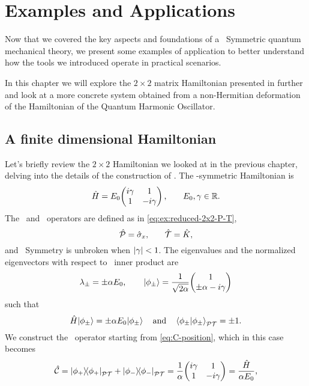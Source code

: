 \chapter{Examples and Applications}\label{ch:examples}
    Now that we covered the key aspects and foundations of a \PT\ Symmetric quantum mechanical theory, we present some examples of application to better understand how the tools we introduced operate in practical scenarios.
    
    In this chapter we will explore the $2\times2$ matrix Hamiltonian presented in  further and look at a more concrete system obtained from a non-Hermitian deformation of the Hamiltonian of the Quantum Harmonic Oscillator.
    \section{A finite dimensional Hamiltonian}
        Let's briefly review the $2\times2$ Hamiltonian we looked at in the previous chapter, delving into the details of the construction of \hC. The \PT-symmetric Hamiltonian is
        \begin{equation}
            \hH = E_0\! \pmqty{\dmat[1]{i\gamma, -i\gamma}}
            \mycomma \qquad
            E_0,\gamma \in \bbR
            \myperiod
        \end{equation}
        The \hP\ and \hT\ operators are defined as in \eqref{eq:ex:reduced-2x2-P-T},
        \begin{equation*}
            \mathcal{\hat{P}} = \hat{\sigma}_x \text{,} \qquad \mathcal{\hat{T}} = \hat{K}
            \text{,}
        \end{equation*}
        and \PT\ Symmetry is unbroken when $\abs{\gamma} < 1$. The eigenvalues and the normalized eigenvectors with respect to \PT\ inner product are
        \begin{equation*}
            \lambda_\pm = \pm \alpha E_0
            \mycomma
            \qquad
            \ket{\phi_\pm} = \frac{1}{\sqrt{2\alpha}} \!\pmqty{1 \\ \pm\alpha - i \gamma}
        \end{equation*}
        such that
        \begin{equation*}
            \hH \!\ket{\phi_\pm} = \pm \alpha E_0 \!\ket{\phi_\pm}
            \qand
            \braket{\phi_\pm}{\phi_\pm}_{\PT} = \pm 1
            \myperiod
        \end{equation*}
        We construct the \hC\ operator starting from \eqref{eq:C-position}, which in this case becomes
        \begin{equation}
            \hC = \dyad{\phi_+}{\phi_{+}}_{\PT} + \dyad{\phi_-}{\phi_-}_{\PT}
            = \frac{1}{\alpha} \!\pmqty{\dmat[1]{i\gamma, -i\gamma}}
            = \frac{\hH}{\alpha E_0}
            \mycomma
        \end{equation}
